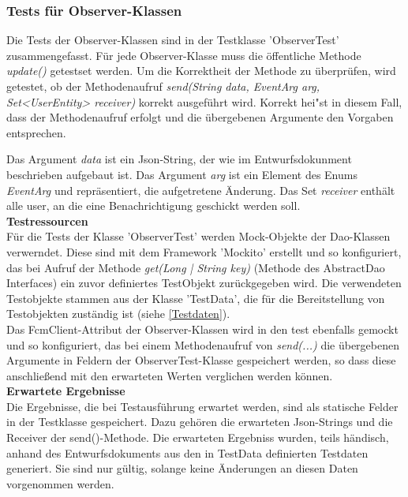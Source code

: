 \documentclass[11pt,a4paper]{scrartcl}
\begin{document}
\subsubsection{Tests für Observer-Klassen}
Die Tests der Observer-Klassen sind in der Testklasse 'ObserverTest' zusammengefasst. Für jede Observer-Klasse muss die öffentliche Methode \textit{update()} getestset werden.
Um die Korrektheit der Methode zu überprüfen, wird getestet, ob der Methodenaufruf \textit{send(String data, EventArg arg, Set<UserEntity> receiver)} korrekt ausgeführt wird. Korrekt hei"st in diesem Fall, dass der Methodenaufruf erfolgt und die übergebenen Argumente den Vorgaben entsprechen.

Das Argument \textit{data} ist ein Json-String, der wie im Entwurfsdokunment beschrieben aufgebaut ist. Das Argument \textit{arg} ist ein Element des Enums \textit{EventArg} und repräsentiert, die aufgetretene Änderung. Das Set \textit{receiver} enthält alle user, an die eine Benachrichtigung geschickt werden soll.\\

\textbf{Testressourcen}\\
Für die Tests der Klasse 'ObserverTest' werden Mock-Objekte der Dao-Klassen verwerndet. Diese sind mit dem Framework 'Mockito' erstellt und so konfiguriert, das bei Aufruf der Methode \textit{get({Long | String} key)} (Methode des AbstractDao Interfaces) ein zuvor definiertes TestObjekt zurückgegeben wird. Die verwendeten Testobjekte stammen aus der Klasse 'TestData', die für die Bereitstellung von Testobjekten zuständig ist (siehe \ref{Testdaten}).\\

Das FcmClient-Attribut der Observer-Klassen wird in den test ebenfalls gemockt und so konfiguriert, das bei einem Methodenaufruf von \textit{send(...)} die übergebenen Argumente in Feldern der ObserverTest-Klasse gespeichert werden, so dass diese anschließend mit den erwarteten Werten verglichen werden können.\\

\textbf{Erwartete Ergebnisse}\\
Die Ergebnisse, die bei Testausführung erwartet werden, sind als statische Felder in der Testklasse gespeichert. Dazu gehören die erwarteten Json-Strings und die Receiver der send()-Methode.
Die erwarteten Ergebniss wurden, teils händisch, anhand des Entwurfsdokuments aus den in TestData definierten Testdaten generiert. Sie sind nur gültig, solange keine Änderungen an diesen Daten vorgenommen werden.
\end{document}

